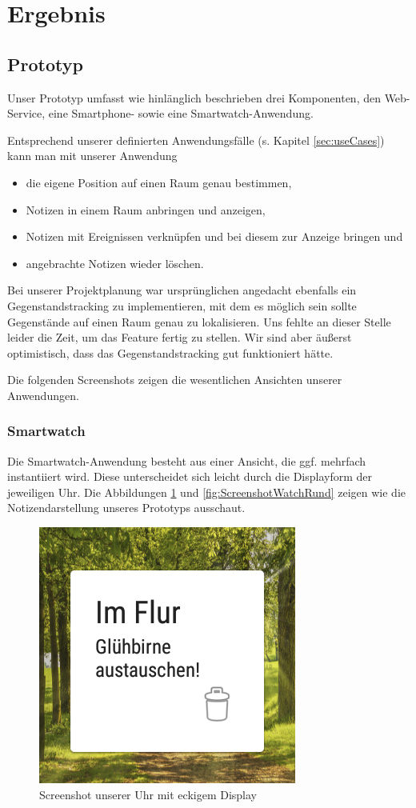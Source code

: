 \section{Ergebnis}

\subsection{Prototyp}
\label{sec:prototyp}
Unser Prototyp umfasst wie hinlänglich beschrieben drei Komponenten, den Web-Service, eine Smartphone- sowie eine Smartwatch-Anwendung. 

Entsprechend unserer definierten Anwendungsfälle (s. Kapitel \ref{sec:useCases}) kann man mit unserer Anwendung
\begin{itemize}
\item{die eigene Position auf einen Raum genau bestimmen,}
\item{Notizen in einem Raum anbringen und anzeigen,}
\item{Notizen mit Ereignissen verknüpfen und bei diesem zur Anzeige bringen und}
\item{angebrachte Notizen wieder löschen.} 
\end{itemize}

Bei unserer Projektplanung war ursprünglichen angedacht ebenfalls ein Gegenstandstracking zu implementieren, mit dem es möglich sein sollte Gegenstände auf einen Raum genau zu lokalisieren. Uns fehlte an dieser Stelle leider die Zeit, um das Feature fertig zu stellen. Wir sind aber äußerst optimistisch, dass das Gegenstandstracking gut funktioniert hätte.

Die folgenden Screenshots zeigen die wesentlichen Ansichten unserer Anwendungen.

\subsubsection{Smartwatch}
Die Smartwatch-Anwendung besteht aus einer Ansicht, die ggf. mehrfach instantiiert wird. Diese unterscheidet sich leicht durch die Displayform der jeweiligen Uhr. Die Abbildungen \ref{fig:ScreenshotWatchEckig} und \ref{fig:ScreenshotWatchRund} zeigen wie die Notizendarstellung unseres Prototyps ausschaut.

\begin{figure}[H]
\centering
\includegraphics[width=0.3\linewidth]{../Bilder/ScreenshotWatchEckig}
\caption{Screenshot unserer Uhr mit eckigem Display}
\label{fig:ScreenshotWatchEckig}
\end{figure}

